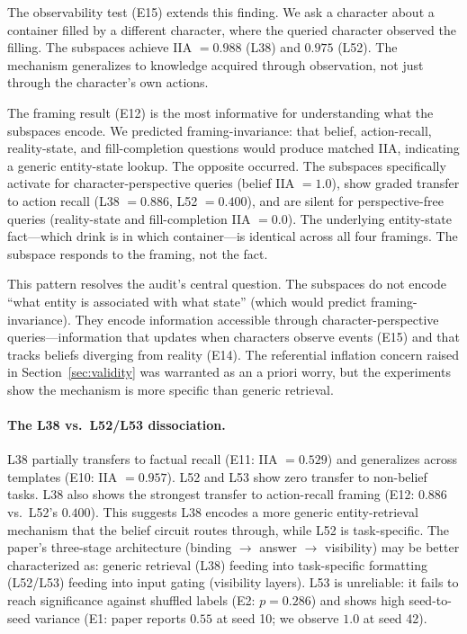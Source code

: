 \documentclass[11pt]{article}
\begin{document}
The observability test (E15) extends this finding. We ask a character about a container filled by a different character, where the queried character observed the filling. The subspaces achieve IIA $= 0.988$ (L38) and $0.975$ (L52). The mechanism generalizes to knowledge acquired through observation, not just through the character's own actions.

The framing result (E12) is the most informative for understanding what the subspaces encode. We predicted framing-invariance: that belief, action-recall, reality-state, and fill-completion questions would produce matched IIA, indicating a generic entity-state lookup. The opposite occurred. The subspaces specifically activate for character-perspective queries (belief IIA $= 1.0$), show graded transfer to action recall (L38 $= 0.886$, L52 $= 0.400$), and are silent for perspective-free queries (reality-state and fill-completion IIA $= 0.0$). The underlying entity-state fact---which drink is in which container---is identical across all four framings. The subspace responds to the framing, not the fact.

This pattern resolves the audit's central question. The subspaces do not encode ``what entity is associated with what state'' (which would predict framing-invariance). They encode information accessible through character-perspective queries---information that updates when characters observe events (E15) and that tracks beliefs diverging from reality (E14). The referential inflation concern raised in Section~\ref{sec:validity} was warranted as an a priori worry, but the experiments show the mechanism is more specific than generic retrieval.

\paragraph{The L38 vs.\ L52/L53 dissociation.}
L38 partially transfers to factual recall (E11: IIA $= 0.529$) and generalizes across templates (E10: IIA $= 0.957$). L52 and L53 show zero transfer to non-belief tasks. L38 also shows the strongest transfer to action-recall framing (E12: $0.886$ vs.\ L52's $0.400$). This suggests L38 encodes a more generic entity-retrieval mechanism that the belief circuit routes through, while L52 is task-specific. The paper's three-stage architecture (binding $\to$ answer $\to$ visibility) may be better characterized as: generic retrieval (L38) feeding into task-specific formatting (L52/L53) feeding into input gating (visibility layers). L53 is unreliable: it fails to reach significance against shuffled labels (E2: $p = 0.286$) and shows high seed-to-seed variance (E1: paper reports $0.55$ at seed 10; we observe $1.0$ at seed 42).
\end{document}
